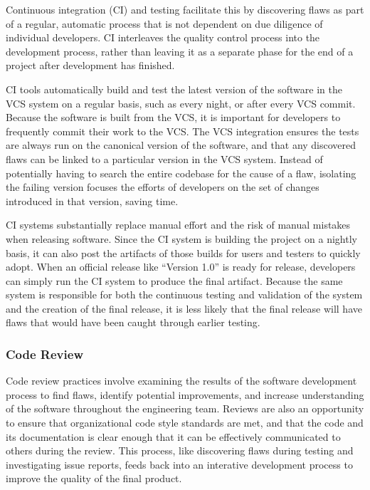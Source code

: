 Continuous integration (CI) and testing facilitate this by discovering
flaws as part of a regular, automatic process that is not dependent on
due diligence of individual developers. CI interleaves the quality
control process into the development process, rather than leaving it
as a separate phase for the end of a project after development has
finished.

CI tools automatically build and test the latest version of the
software in the VCS system on a regular basis, such as every night, or
after every VCS commit. Because the software is built from the VCS, it
is important for developers to frequently commit their work to the
VCS. The VCS integration ensures the tests are always run on the
canonical version of the software, and that any discovered flaws can
be linked to a particular version in the VCS system. Instead of
potentially having to search the entire codebase for the cause of a
flaw, isolating the failing version focuses the efforts of developers
on the set of changes introduced in that version, saving time.

CI systems substantially replace manual effort and the risk of manual
mistakes when releasing software. Since the CI system is building the
project on a nightly basis, it can also post the artifacts of those
builds for users and testers to quickly adopt. When an official
release like ``Version 1.0'' is ready for release, developers can
simply run the CI system to produce the final artifact. Because the
same system is responsible for both the continuous testing and
validation of the system and the creation of the final release, it is
less likely that the final release will have flaws that would have
been caught through earlier testing.

\subsubsection{Code Review}

Code review practices involve examining the results of the software
development process to find flaws, identify potential improvements,
and increase understanding of the software throughout the engineering
team. Reviews are also an opportunity to ensure that organizational
code style standards are met, and that the code and its documentation
is clear enough that it can be effectively communicated to others
during the review. This process, like discovering flaws during
testing and investigating issue reports, feeds back into an interative
development process to improve the quality of the final product.


